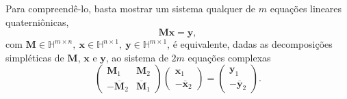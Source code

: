 \documentclass[
	11pt,				%
	openright,			%
	twoside,			%
	a4paper,			%
	french,				%
	brazil,			%
	english				%
	]{abntex2}
\begin{document}
\begin{apendicesenv}
Para compreend\^e-lo, basta mostrar um sistema qualquer de $ m $ equa\c c\~oes lineares quaterni\^onicas,
\begin{equation}
\label{eq:A2}
\mathbf{M} \mathbf{x} = \mathbf{y},
\end{equation}
com $ \mathbf{M} \in \mathbb{H}^{m\times n} ,\ \mathbf{x} \in \mathbb{H}^{n \times 1}, \ \mathbf{y} \in \mathbb{H}^{m \times 1} $, \'e equivalente, dadas as decomposi\c c\~oes simpl\'eticas de $ \mathbf{M} $, $ \mathbf{x} $ e $ \mathbf{y} $, ao sistema de $ 2m $ equa\c c\~oes complexas
\begin{equation}
\label{eq:A3}
\begin{pmatrix}
\mathbf{M}_1 & \mathbf{M}_2\\ 
- \overline{\mathbf{M}}_2 & \overline{\mathbf{M}}_1
\end{pmatrix}
\begin{pmatrix}
\mathbf{x}_1 \\ 
- \overline{\mathbf{x}}_2
\end{pmatrix}
=
\begin{pmatrix}
\mathbf{y}_1 \\ 
- \overline{\mathbf{y}}_2
\end{pmatrix}.
\end{equation}


\end{apendicesenv}
\end{document}
